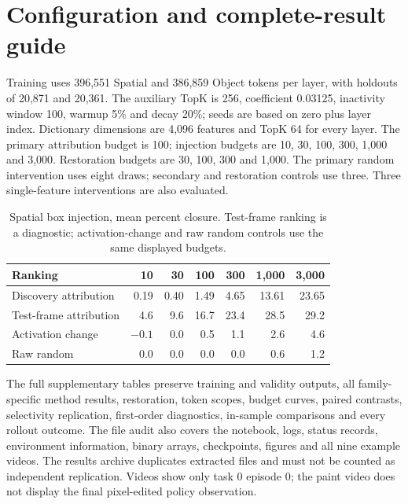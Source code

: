 \documentclass{article}
\begin{document}
\section{Configuration and complete-result guide}
\label{app:config}
Training uses 396,551 Spatial and 386,859 Object tokens per layer, with holdouts of 20,871 and 20,361. The auxiliary TopK is 256, coefficient 0.03125, inactivity window 100, warmup 5\% and decay 20\%; seeds are based on zero plus layer index. Dictionary dimensions are 4,096 features and TopK 64 for every layer. The primary attribution budget is 100; injection budgets are 10, 30, 100, 300, 1,000 and 3,000. Restoration budgets are 30, 100, 300 and 1,000. The primary random intervention uses eight draws; secondary and restoration controls use three. Three single-feature interventions are also evaluated.

\begin{table}[h]
\centering\small
\caption{Spatial box injection, mean percent closure. Test-frame ranking is a diagnostic; activation-change and raw random controls use the same displayed budgets.}
\begin{tabular}{lrrrrrr}
\toprule
Ranking & 10 & 30 & 100 & 300 & 1,000 & 3,000\\
\midrule
Discovery attribution & 0.19 & 0.40 & 1.49 & 4.65 & 13.61 & 23.65\\
Test-frame attribution & 4.6 & 9.6 & 16.7 & 23.4 & 28.5 & 29.2\\
Activation change & $-0.1$ & 0.0 & 0.5 & 1.1 & 2.6 & 4.6\\
Raw random & 0.0 & 0.0 & 0.0 & 0.0 & 0.6 & 1.2\\
\bottomrule
\end{tabular}
\end{table}

The full supplementary tables preserve training and validity outputs, all family-specific method results, restoration, token scopes, budget curves, paired contrasts, selectivity replication, first-order diagnostics, in-sample comparisons and every rollout outcome. The file audit also covers the notebook, logs, status records, environment information, binary arrays, checkpoints, figures and all nine example videos. The results archive duplicates extracted files and must not be counted as independent replication. Videos show only task 0 episode 0; the paint video does not display the final pixel-edited policy observation.
\end{document}
